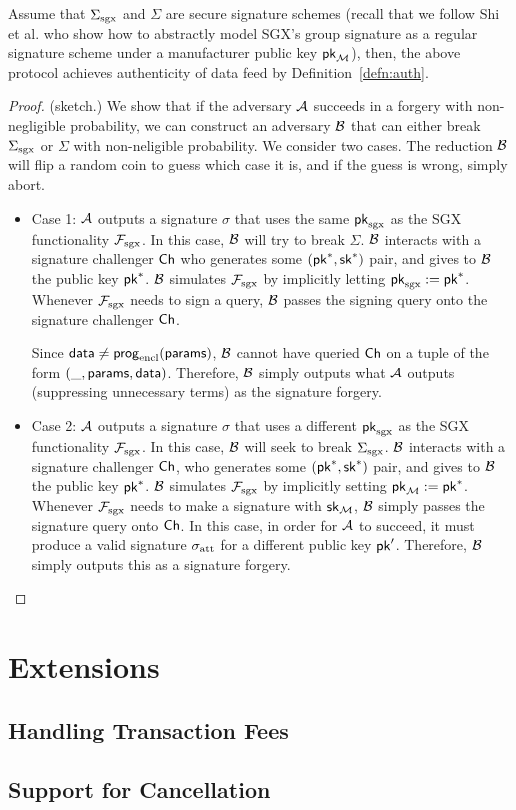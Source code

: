 \begin{theorem}[Authenticity]
Assume that ${\Sigma_{\textrm{sgx}}}$
and $\Sigma$ are secure signature schemes (recall
that we follow Shi et al.  who show
how to abstractly  
model SGX's group signature as a regular signature
scheme under a manufacturer public key ${\sf pk}_{\mathcal{M}}$),
then, the above 
protocol achieves authenticity of data feed by Definition~\ref{defn:auth}.
\end{theorem}
\begin{proof} (sketch.)
We show that if the 
adversary $\mathcal{A}$ succeeds in a forgery with non-negligible probability,
we can construct an adversary $\mathcal{B}$ that can either
break ${\Sigma_{\textrm{sgx}}}$ or $\Sigma$ with non-neligible probability.
We consider two cases. 
The reduction $\mathcal{B}$ will flip a random coin to guess which
case it is, and if the guess is wrong, simply abort.
\begin{itemize}[leftmargin=5mm]
\item
Case 1: $\mathcal{A}$ outputs a signature $\sigma$ that uses the same  
${\sf pk}_{\textrm{sgx}}$ as the SGX functionality $\mathcal{F}_{\textrm{sgx}}$.
In this case, $\mathcal{B}$ will try to break $\Sigma$. 
$\mathcal{B}$ interacts with a signature challenger ${\sf Ch}$ who generates
some $({\sf pk}^*, {\sf sk}^*)$ pair, and gives to $\mathcal{B}$ the public key
${\sf pk}^*$. $\mathcal{B}$ simulates 
$\mathcal{F}_{\textrm{sgx}}$ by implicitly letting ${\sf pk}_{\textrm{sgx}} := {\sf pk}^*$.
Whenever $\mathcal{F}_{\textrm{sgx}}$ needs to sign a query, $\mathcal{B}$ passes the signing query
onto the signature challenger ${\sf Ch}$.

Since ${\sf data} \neq {\sf prog}_{\textrm{encl}}({\sf params})$,
$\mathcal{B}$ cannot have queried ${\sf Ch}$  
on a tuple of the form $(\_, {\sf params}, {\sf data})$. 
Therefore, $\mathcal{B}$ simply outputs 
what $\mathcal{A}$ 
outputs (suppressing unnecessary terms) as the signature forgery. 

\item
Case 2:
 $\mathcal{A}$ outputs a signature $\sigma$ that uses a different 
${\sf pk}_{\textrm{sgx}}$ as the SGX functionality $\mathcal{F}_{\textrm{sgx}}$.
In this case, $\mathcal{B}$ will seek to break ${\Sigma_{\textrm{sgx}}}$.
$\mathcal{B}$ interacts with a signature challenger ${\sf Ch}$, who generates
some $({\sf pk}^*, {\sf sk}^*)$ pair, and gives to $\mathcal{B}$ the public key
${\sf pk}^*$. $\mathcal{B}$ simulates $\mathcal{F}_{\textrm{sgx}}$ by implicitly setting
${\sf pk}_{\mathcal{M}} := {\sf pk}^*$.
Whenever $\mathcal{F}_{\textrm{sgx}}$ needs to make a signature
with ${\sf sk}_{\mathcal{M}}$, 
$\mathcal{B}$ simply passes the signature query onto ${\sf Ch}$.
In this case, in order for $\mathcal{A}$ to succeed,
it must produce a valid signature ${\sigma_{\textrm{att}}}$ 
for a different public key ${\sf pk}'$.
Therefore, $\mathcal{B}$ simply outputs this as a signature forgery.
\end{itemize}
\end{proof}


\section{Extensions}

\subsection{Handling Transaction Fees}

\subsection{Support for Cancellation}




